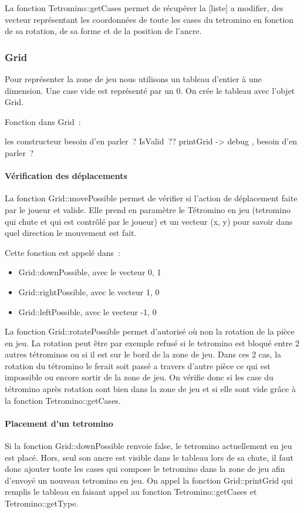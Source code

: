 \documentclass[a4paper, 12pt]{article}
\begin{document}
			La fonction Tetromino::getCases permet de récupérer la [liste] a modifier, des vecteur représentant les coordonnées de toute les cases du tetromino en fonction de sa rotation, de sa forme et de la position de l’ancre.

		\subsubsection{Grid}
			Pour représenter la zone de jeu nous utilisons un tableau d’entier à une dimension. Une case vide est représenté par un 0. 
			On crée le tableau avec l’objet Grid.

			Fonction dans Grid :

			les constructeur besoin d’en parler ?
			IsValid ??
			printGrid -> debug , besoin d’en parler ?

			\paragraph{Vérification des déplacements}
			La fonction Grid::movePossible permet de vérifier si l’action de déplacement faite par le joueur et valide. Elle prend en paramètre le Tétromino en jeu (tetromino qui chute et qui est contrôlé par le joueur) et un vecteur (x, y) pour savoir dans quel direction le mouvement est fait.

			Cette fonction est appelé dans : 
			\begin{itemize}
				\item Grid::downPossible, avec le vecteur {0, 1}
				\item Grid::rightPossible, avec le vecteur {1, 0}
				\item Grid::leftPossible, avec le vecteur {-1, 0}
			\end{itemize}

			La fonction Grid::rotatePossible permet d’autorisé où non la rotation de la pièce en jeu. La rotation peut être par exemple refusé si le tetromino est bloqué entre 2 autres tétrominos ou si il est sur le bord de la zone de jeu. Dans ces 2 cas, la rotation du tétromino le ferait soit passé a travers d’autre pièce ce qui est impossible ou encore sortir de la zone de jeu. On vérifie donc si les case du tétromino après rotation sont bien dans la zone de jeu et si elle sont vide grâce à la fonction Tetromino::getCases.

			\paragraph{Placement d’un tetromino}
			Si la fonction Grid::downPossible renvoie false, le tetromino actuellement en jeu est placé. Hors, seul son ancre est visible dans le tableau lors de sa chute, il faut donc ajouter toute les cases qui compose le tetromino dans la zone de jeu afin d’envoyé un nouveau tetromino en jeu.
			On appel la fonction Grid::printGrid qui remplis le tableau en faisant appel au fonction Tetromino::getCases et Tetromino::getType.
\end{document}
